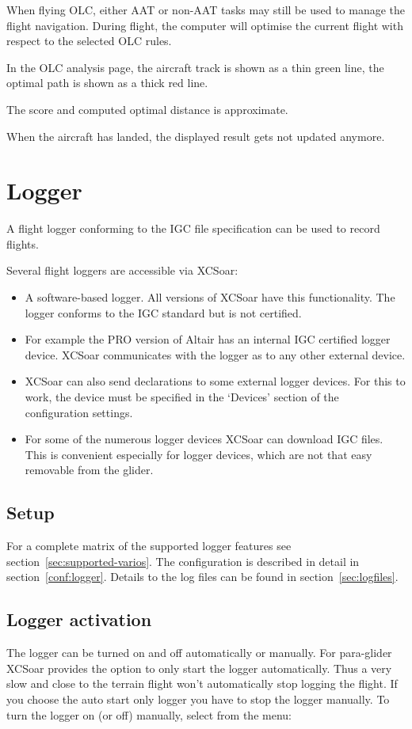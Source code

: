 When flying OLC, either AAT or non-AAT tasks may still be used to
manage the flight navigation.  During flight, the computer will optimise the
current flight with respect to the selected OLC rules.  

In the OLC analysis page, the aircraft track is shown as a thin green line, the optimal 
path is shown as a thick red line.

The score and computed optimal distance is approximate.

When the aircraft has landed, the displayed result gets not updated anymore.


\section{Logger}\label{sec:logger}

A flight logger conforming to the IGC file specification can be used
to record flights.  

Several flight loggers are accessible via XCSoar:
\begin{itemize}
\item A software-based logger.  All versions of XCSoar have this
  functionality.  The logger conforms to the IGC standard but is not
  certified.
\item For example the PRO version of Altair has an internal IGC certified logger 
  device.  XCSoar communicates with the logger as to any other external device.
\item XCSoar can also send declarations to some external logger devices. 
  For this to work, the device must be specified in the `Devices' 
  section of the configuration  settings.
\item  For some of the numerous logger devices XCSoar can download IGC files. 
  This is convenient especially for logger devices, which are not that easy 
  removable from the glider.
\end{itemize}

\subsection*{Setup}
For a complete matrix of the supported logger features see section~\ref{sec:supported-varios}.  
The configuration is described in detail in section~\ref{conf:logger}.  Details 
to the log files can be found in section~\ref{sec:logfiles}.

\subsection*{Logger activation}
The logger can be turned on and off automatically or manually.  For para-glider 
XCSoar provides the option to only start the logger automatically. Thus a very 
slow and close to the terrain flight won't automatically stop logging the flight. 
If you choose the auto start only logger you have to stop the logger manually.
To turn the logger on (or off) manually, select from the menu:
\begin{quote}
\blink{}
\end{quote}

